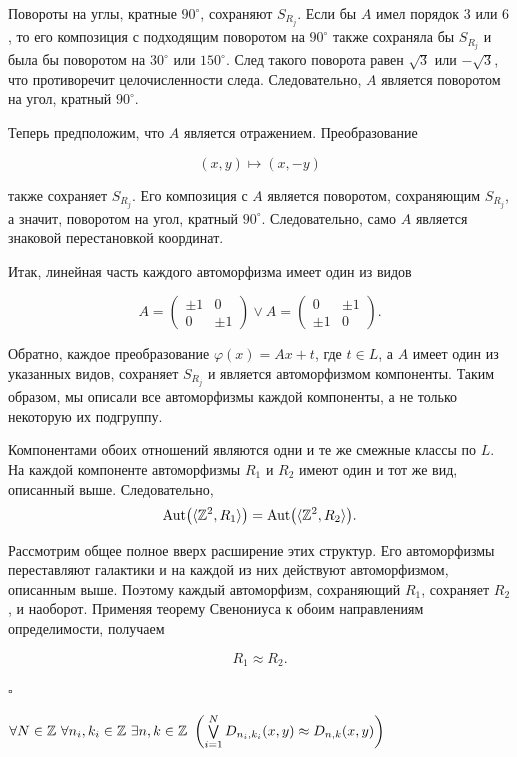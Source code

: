 Повороты на углы, кратные $90^\circ$, сохраняют $S_{R_j}$. Если бы $A$ имел
порядок $3$ или $6$, то его композиция с подходящим поворотом на
$90^\circ$ также сохраняла бы $S_{R_j}$ и была бы поворотом на $30^\circ$
или $150^\circ$. След такого поворота равен $\sqrt3$ или $-\sqrt3$, что
противоречит целочисленности следа. Следовательно, $A$ является поворотом на
угол, кратный $90^\circ$.

Теперь предположим, что $A$ является отражением. Преобразование

$$(x,y)\longmapsto(x,-y)$$

также сохраняет $S_{R_j}$. Его композиция с $A$ является поворотом,
сохраняющим $S_{R_j}$, а значит, поворотом на угол, кратный $90^\circ$.
Следовательно, само $A$ является знаковой перестановкой координат.

Итак, линейная часть каждого автоморфизма имеет один из видов

$$A=
\begin{pmatrix}
  \pm1&0\\
  0&\pm1
\end{pmatrix}
\vee
A=
\begin{pmatrix}
  0&\pm1\\
  \pm1&0
\end{pmatrix}.$$

Обратно, каждое преобразование $\varphi(x)=Ax+t$, где $t\in L$, а $A$ имеет
один из указанных видов, сохраняет $S_{R_j}$ и является автоморфизмом
компоненты. Таким образом, мы описали все автоморфизмы каждой компоненты, а
не только некоторую их подгруппу.

Компонентами обоих отношений являются одни и те же смежные классы по $L$.
На каждой компоненте автоморфизмы $R_1$ и $R_2$ имеют один и тот же вид,
описанный выше. Следовательно,
$$
\operatorname{Aut}\bigl(\langle\mathbb{Z}^2,R_1\rangle\bigr)
=\operatorname{Aut}\bigl(\langle\mathbb{Z}^2,R_2\rangle\bigr).
$$

Рассмотрим общее полное вверх расширение этих структур. Его автоморфизмы
переставляют галактики и на каждой из них действуют автоморфизмом, описанным
выше. Поэтому каждый автоморфизм, сохраняющий $R_1$, сохраняет $R_2$, и
наоборот. Применяя теорему Свенониуса к обоим направлениям определимости,
получаем

$$R_1\approx R_2.$$

\hfill $\square$
\bs

\begin{theorem}
    \label{theorem:DnkUnionToDnk}
    $\forall N \in \Int\ \forall n_i, k_i \in \Int\ \exists n, k \in \Int\ \left(\bigvee \limits_{i = 1}^{N} D_{n_i, k_i}(x,y) \approx D_{n,k}(x,y)\right)$
\end{theorem}

